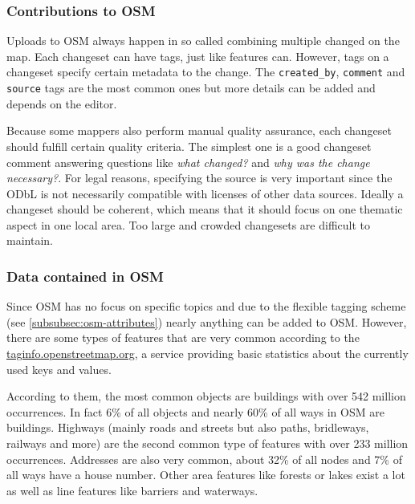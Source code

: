 		\subsubsection{Contributions to OSM}
		
			Uploads to OSM always happen in so called  combining multiple changed on the map\cite{osm-wiki-changeset}.
			Each changeset can have tags, just like features can.
			However, tags on a changeset specify certain metadata to the change.
			The \texttt{created\_by}, \texttt{comment} and \texttt{source} tags are the most common ones but more details can be added and depends on the editor.
			
			Because some mappers also perform manual quality assurance, each changeset should fulfill certain quality criteria.
			The simplest one is a good changeset comment answering questions like \textit{what changed?} and \textit{why was the change necessary?}.
			For legal reasons, specifying the source is very important since the ODbL is not necessarily compatible with licenses of other data sources.
			Ideally a changeset should be coherent, which means that it should focus on one thematic aspect in one local area.
			Too large and crowded changesets are difficult to maintain.
			
		\subsubsection{Data contained in OSM}
		
			Since OSM has no focus on specific topics and due to the flexible tagging scheme (see \cref{subsubsec:osm-attributes}) nearly anything can be added to OSM.
			However, there are some types of features that are very common according to the \href{https://taginfo.openstreetmap.org/keys}{taginfo.openstreetmap.org}, a service providing basic statistics about the currently used keys and values\cite{taginfo-keys}.
			
			According to them, the most common objects are buildings with over 542 million occurrences.
			In fact 6\% of all objects and nearly 60\% of all ways in OSM are buildings.
			Highways (mainly roads and streets but also paths, bridleways, railways and more) are the second common type of features with over 233 million occurrences.
			Addresses are also very common, about 32\% of all nodes and 7\% of all ways have a house number.
			Other area features like forests or lakes exist a lot as well as line features like barriers and waterways.
			
